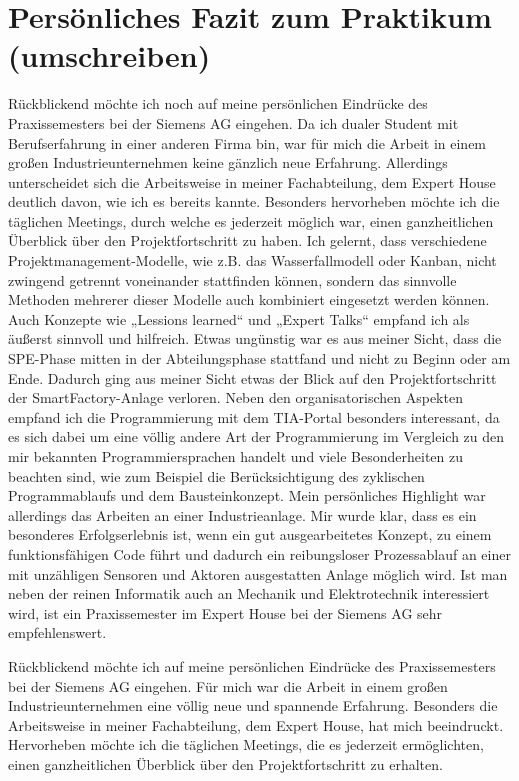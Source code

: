 \chapter{Persönliches Fazit zum Praktikum (umschreiben)}

Rückblickend möchte ich noch auf meine persönlichen Eindrücke des
Praxissemesters bei der Siemens AG eingehen.
Da ich dualer Student mit Berufserfahrung in einer anderen Firma bin, war für
mich die Arbeit in einem großen Industrieunternehmen keine gänzlich neue
Erfahrung. Allerdings unterscheidet sich die Arbeitsweise in meiner Fachabteilung,
dem Expert House deutlich davon, wie ich es bereits kannte. Besonders
hervorheben möchte ich die täglichen Meetings, durch welche es jederzeit möglich
war, einen ganzheitlichen Überblick über den Projektfortschritt zu haben. Ich
gelernt, dass verschiedene Projektmanagement-Modelle, wie z.B. das
Wasserfallmodell oder Kanban, nicht zwingend getrennt voneinander stattfinden
können, sondern das sinnvolle Methoden mehrerer dieser Modelle auch
kombiniert eingesetzt werden können. Auch Konzepte wie „Lessions learned“ und
„Expert Talks“ empfand ich als äußerst sinnvoll und hilfreich.
Etwas ungünstig war es aus meiner Sicht, dass die SPE-Phase mitten in der
Abteilungsphase stattfand und nicht zu Beginn oder am Ende. Dadurch ging aus
meiner Sicht etwas der Blick auf den Projektfortschritt der SmartFactory-Anlage
verloren. Neben den organisatorischen Aspekten empfand ich die
Programmierung mit dem TIA-Portal besonders interessant, da es sich dabei um
eine völlig andere Art der Programmierung im Vergleich zu den mir bekannten
Programmiersprachen handelt und viele Besonderheiten zu beachten sind, wie
zum Beispiel die Berücksichtigung des zyklischen Programmablaufs und dem
Bausteinkonzept. Mein persönliches Highlight war allerdings das Arbeiten an einer
Industrieanlage. Mir wurde klar, dass es ein besonderes Erfolgserlebnis ist, wenn
ein gut ausgearbeitetes Konzept, zu einem funktionsfähigen Code führt und
dadurch ein reibungsloser Prozessablauf an einer mit unzähligen Sensoren und
Aktoren ausgestatten Anlage möglich wird. Ist man neben der reinen Informatik
auch an Mechanik und Elektrotechnik interessiert wird, ist ein Praxissemester im
Expert House bei der Siemens AG sehr empfehlenswert.

Rückblickend möchte ich auf meine persönlichen Eindrücke des Praxissemesters bei der Siemens AG eingehen. Für mich war die Arbeit in einem großen 
Industrieunternehmen eine völlig neue und spannende Erfahrung. Besonders die Arbeitsweise in meiner Fachabteilung, dem Expert House, hat mich beeindruckt. 
Hervorheben möchte ich die täglichen Meetings, die es jederzeit ermöglichten, einen ganzheitlichen Überblick über den Projektfortschritt zu erhalten.

